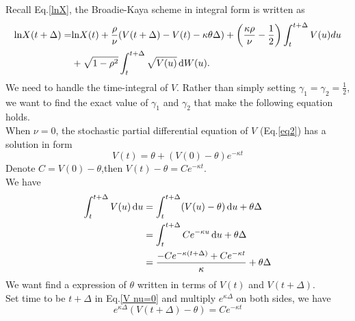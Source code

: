 \documentclass{ws-ijfe}
\begin{document}
Recall Eq.\eqref{lnX}, the Broadie-Kaya scheme in integral form is written as
\begin{equation*}
\begin{split}
    \text{ln}X(t+\Delta)=&\text{ln}X(t)+\frac{\rho}{\nu}(V(t+\Delta)-V(t)-\kappa\theta\Delta)+\bigg(\frac{\kappa\rho}{\nu}-\frac{1}{2}\bigg)\int_{t}^{t+\Delta} V(u)du\\
     &+\sqrt{1-\rho^2}\int_{t}^{t+\Delta}\sqrt{V(u)}\,\mathrm{d} W(u).
\end{split}
\end{equation*}
We need to handle the time-integral of $V$. Rather than simply setting $\gamma_1=\gamma_2=\frac{1}{2}$, we want to find the exact value of $\gamma_1$ and $\gamma_2$ that make the following equation holds.\\
When $\nu=0$, the stochastic partial differential equation of $V$ (Eq.\eqref{eq2}) has a solution in form
\begin{equation}\label{V nu=0}
  V(t)=\theta + (V(0)-\theta)e^{-\kappa t}
\end{equation}
Denote $C=V(0)-\theta$,then $V(t)-\theta= Ce^{-\kappa t}$.\\
We have
\begin{equation}\label{int V}
  \begin{split}
    \int_{t}^{t+\Delta}V(u)\,\d u&= \int_{t}^{t+\Delta}(V(u)-\theta)\,\d u+\theta\Delta\\
    &=\int_{t}^{t+\Delta}Ce^{-\kappa u}\,\d u +\theta\Delta\\
    &=\frac{-Ce^{-\kappa(t+\Delta)}+Ce^{-\kappa t}}{\kappa}+\theta\Delta\\
  \end{split}
\end{equation}
We want find a expression of $\theta$ written in terms of $V(t)$ and $V(t+\Delta)$.\\
Set time to be $t+\Delta$ in Eq.\eqref{V nu=0} and multiply $e^{\kappa\Delta}$ on both sides, we have
\begin{equation*}
  e^{\kappa\Delta}(V(t+\Delta)-\theta)=Ce^{-\kappa  t}
\end{equation*}
\end{document}
